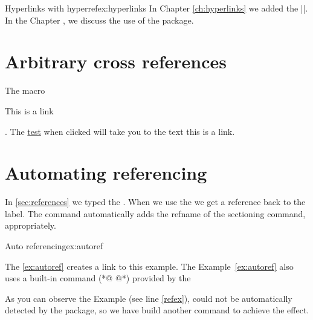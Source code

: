 \begin{texexample}{Hyperlinks with hyperref}{ex:hyperlinks}
In Chapter \ref{ch:hyperlinks} we added the |\label{ch:hyperlinks}|. In the Chapter , we discuss
the use of the  package.
\end{texexample}




\section{Arbitrary cross references}


The macro \CMDI{\hyperlink}


\hypertarget{linktest}{This is a link}.   The \hyperlink{linktest}{test} when clicked will take you to the text this is a
link.

\def\sectionautorefname{Section}
\def\exampleautorefname{Example}
\def\refexample#1{Example~\ref{#1}\xspace}
\let\exampleref\refexample
\section{Automating referencing}



\label{sec:references}

In \autoref{sec:references} we typed the \cmd{\label}. When we use the \CMDI{\autoref} we get a  reference back to the label. 
The command automatically adds the refname of the sectioning command, appropriately.


\begin{texexample}{Auto referencing}{ex:autoref}
\begin{teX}
The \autoref{ex:autoref} creates a link to this example. 
The \refexample{ex:autoref} also uses a built-in command (*@ \label{refex} @*)
provided by the 
\end{teX}
\end{texexample}

As you can observe the Example (see line \ref{refex}), could not be automatically detected by the  package, so we have build another command  to achieve the effect.

